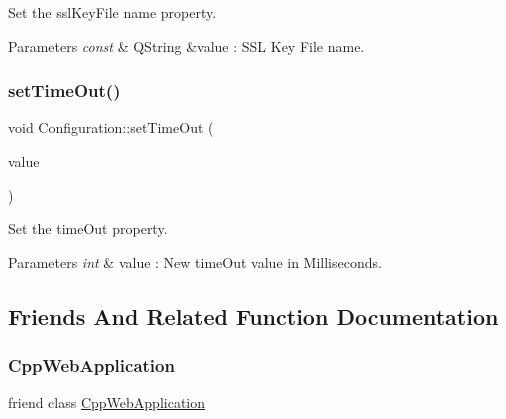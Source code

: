 Set the ssl\+Key\+File name property. 


\begin{DoxyParams}{Parameters}
{\em const} & Q\+String \&value \+: S\+SL Key File name. \\
\hline
\end{DoxyParams}
\mbox{\label{class_configuration_a4fc1c685775b37e7b553c3393f1b2998}} 
\subsubsection{\texorpdfstring{set\+Time\+Out()}{setTimeOut()}}
{\footnotesize\ttfamily void Configuration\+::set\+Time\+Out (\begin{DoxyParamCaption}\item[{int}]{value }\end{DoxyParamCaption})}



Set the time\+Out property. 


\begin{DoxyParams}{Parameters}
{\em int} & value \+: New time\+Out value in Milliseconds. \\
\hline
\end{DoxyParams}


\subsection{Friends And Related Function Documentation}
\mbox{\label{class_configuration_af79af37b83b26f7eeb57dcb953a09845}} 
\subsubsection{\texorpdfstring{Cpp\+Web\+Application}{CppWebApplication}}
{\footnotesize\ttfamily friend class \hyperlink{class_cpp_web_application}{Cpp\+Web\+Application}\hspace{0.3cm}{\ttfamily [friend]}}

\mbox{\label{class_configuration_af35951d3389bacc3d625fc73174f7364}} 
